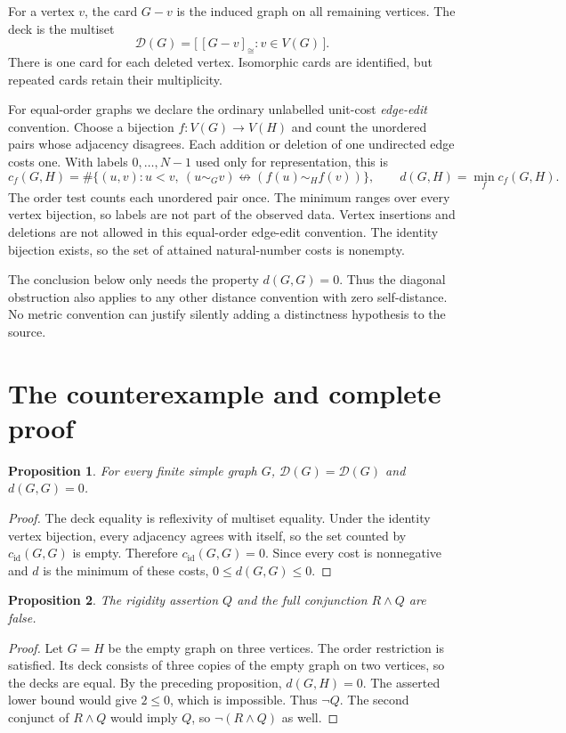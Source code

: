 \documentclass[11pt]{article}
\newtheorem{proposition}{Proposition}
\newcommand{\deck}{\mathcal D}
\begin{document}
For a vertex $v$, the card $G-v$ is the induced graph on all remaining vertices. The deck is the multiset
\[
 \deck(G)=\bigl[\,[G-v]_{\cong}:v\in V(G)\,\bigr].
\]
There is one card for each deleted vertex. Isomorphic cards are identified, but repeated cards retain their multiplicity.

For equal-order graphs we declare the ordinary unlabelled unit-cost \emph{edge-edit} convention. Choose a bijection $f:V(G)\to V(H)$ and count the unordered pairs whose adjacency disagrees. Each addition or deletion of one undirected edge costs one. With labels $0,\ldots,N-1$ used only for representation, this is
\[
 c_f(G,H)=\#\{(u,v):u<v,\ (u\sim_G v)\not\leftrightarrow(f(u)\sim_H f(v))\},
 \qquad d(G,H)=\min_f c_f(G,H).
\]
The order test counts each unordered pair once. The minimum ranges over every vertex bijection, so labels are not part of the observed data. Vertex insertions and deletions are not allowed in this equal-order edge-edit convention. The identity bijection exists, so the set of attained natural-number costs is nonempty.

The conclusion below only needs the property $d(G,G)=0$. Thus the diagonal obstruction also applies to any other distance convention with zero self-distance. No metric convention can justify silently adding a distinctness hypothesis to the source.

\section{The counterexample and complete proof}
\begin{proposition}
For every finite simple graph $G$, $\deck(G)=\deck(G)$ and $d(G,G)=0$.
\end{proposition}
\begin{proof}
The deck equality is reflexivity of multiset equality. Under the identity vertex bijection, every adjacency agrees with itself, so the set counted by $c_{\mathrm{id}}(G,G)$ is empty. Therefore $c_{\mathrm{id}}(G,G)=0$. Since every cost is nonnegative and $d$ is the minimum of these costs, $0\leq d(G,G)\leq0$.
\end{proof}

\begin{proposition}
The rigidity assertion $Q$ and the full conjunction $R\land Q$ are false.
\end{proposition}
\begin{proof}
Let $G=H$ be the empty graph on three vertices. The order restriction is satisfied. Its deck consists of three copies of the empty graph on two vertices, so the decks are equal. By the preceding proposition, $d(G,H)=0$. The asserted lower bound would give $2\leq0$, which is impossible. Thus $\neg Q$. The second conjunct of $R\land Q$ would imply $Q$, so $\neg(R\land Q)$ as well.
\end{proof}
\end{document}
